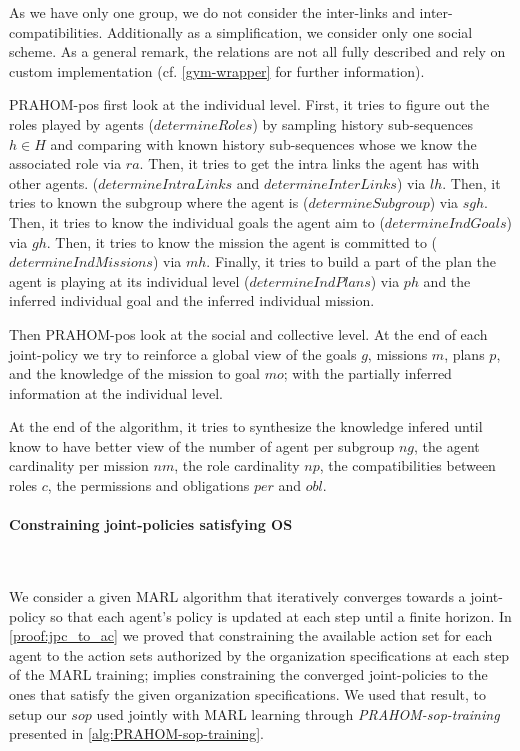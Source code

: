 \documentclass{ecai}
\newcounter{relation}
\newcounter{proof}
\begin{document}
As we have only one group, we do not consider the inter-links and inter-compatibilities. Additionally as a simplification, we consider only one social scheme. As a general remark, the  relations are not all fully described and rely on custom implementation (cf. \autoref{gym-wrapper} for further information).

PRAHOM-pos first look at the individual level.
First, it tries to figure out the roles played by agents ($determineRoles$) by sampling history sub-sequences $h \in H$ and comparing with known history sub-sequences whose we know the associated role via $ra$.
Then, it tries to get the intra links the agent has with other agents. ($determineIntraLinks$ and $determineInterLinks$) via $lh$.
Then, it tries to known the subgroup where the agent is ($determineSubgroup$) via $sgh$.
Then, it tries to know the individual goals the agent aim to ($determineIndGoals$) via $gh$.
Then, it tries to know the mission the agent is committed to ($determineIndMissions$) via $mh$.
Finally, it tries to build a part of the plan the agent is playing at its individual level ($determineIndPlans$) via $ph$ and the inferred individual goal and the inferred individual mission.

Then PRAHOM-pos look at the social and collective level.
At the end of each joint-policy we try to reinforce a global view of the goals $g$, missions $m$, plans $p$, and the knowledge of the mission to goal $mo$; with the partially inferred information at the individual level.

At the end of the algorithm, it tries to synthesize the knowledge infered until know to have better view of the number of agent per subgroup $ng$, the agent cardinality per mission $nm$, the role cardinality $np$, the compatibilities between roles $c$, the permissions and obligations $per$ and $obl$.


\paragraph{\textbf{Constraining joint-policies satisfying OS}}

\

We consider a given MARL algorithm that iteratively converges towards a joint-policy so that each agent's policy is updated at each step until a finite horizon. In \autoref{proof:jpc_to_ac} we proved that constraining the available action set for each agent to the action sets authorized by the organization specifications at each step of the MARL training; implies constraining the converged joint-policies to the ones that satisfy the given organization specifications. We used that result, to setup our $sop$ used jointly with MARL learning through \emph{PRAHOM-sop-training} presented in \autoref{alg:PRAHOM-sop-training}.
\end{document}
